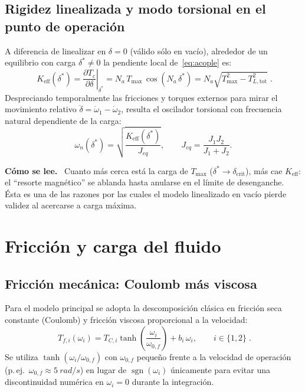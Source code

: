 \documentclass[11pt,a4paper,oneside]{report}
\theoremstyle{definition}
\theoremstyle{remark}
\newenvironment{lectura}%
  {\par\smallskip\noindent\textbf{Cómo se lee.}\ }%
  {\par\smallskip}
\newcommand{\sgn}{\operatorname{sgn}}
\begin{document}
\section{Rigidez linealizada y modo torsional en el punto de operación}
A diferencia de linealizar en $\delta=0$ (válido sólo en vacío), alrededor de un
equilibrio con carga $\delta^\ast\ne 0$ la pendiente local de~\eqref{eq:acople}
es:
\begin{equation}
  \boxed{\;K_{\text{eff}}(\delta^\ast)
    = \left.\frac{\partial T_c}{\partial \delta}\right|_{\delta^\ast}
    = N_a\,T_{\max}\,\cos(N_a\,\delta^\ast)
    = N_a\sqrt{T_{\max}^2 - T_{L,\text{tot}}^2}\;.}
  \label{eq:keff}
\end{equation}
Despreciando temporalmente las fricciones y torques externos para mirar el
movimiento relativo $\ddot\delta = \dot\omega_1 - \dot\omega_2$, resulta el
oscilador torsional con frecuencia natural dependiente de la carga:
\begin{equation}
  \omega_n(\delta^\ast) = \sqrt{\frac{K_{\text{eff}}(\delta^\ast)}{J_{eq}}},
  \qquad J_{eq} = \frac{J_1 J_2}{J_1 + J_2}.
\end{equation}
\begin{lectura}
Cuanto más cerca está la carga de $T_{\max}$ ($\delta^\ast \to \delta_{\text{crit}}$),
más cae $K_{\text{eff}}$: el ``resorte magnético'' se ablanda hasta anularse en
el límite de desenganche. Ésta es una de las razones por las cuales el modelo
linealizado en vacío pierde validez al acercarse a carga máxima.
\end{lectura}

\chapter{Fricción y carga del fluido}\label{cap:cargas}

\section{Fricción mecánica: Coulomb más viscosa}\label{sec:friccion}
Para el modelo principal se adopta la descomposición clásica en fricción seca
constante (Coulomb) y fricción viscosa proporcional a la velocidad:
\begin{equation}
  \boxed{\;T_{f,i}(\omega_i) = T_{C,i}\tanh\!\left(\frac{\omega_i}{\omega_{0,f}}\right) + b_i\,\omega_i,
  \qquad i\in\{1,2\}\;.}
  \label{eq:friccion_simple}
\end{equation}
Se utiliza $\tanh(\omega_i/\omega_{0,f})$ con $\omega_{0,f}$ pequeño frente a
la velocidad de operación (p.\,ej.\ $\omega_{0,f}\approx \SI{5}{rad/s}$) en
lugar de $\sgn(\omega_i)$ únicamente para evitar una discontinuidad numérica en
$\omega_i=0$ durante la integración.
\end{document}
